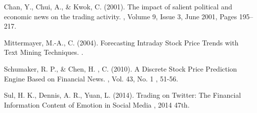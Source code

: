 \documentclass[twoside]{article}
\begin{document}
\begin{multicols}{2}

\begin{thebibliography}{99} %

Chan, Y., Chui, A., \& Kwok, C. (2001).
\newblock The impact of salient political and economic news on the trading activity.
, Volume 9, Issue 3, June 2001, Pages 195–217.

Mittermayer, M.-A., C. (2004).
\newblock Forecasting Intraday Stock Price Trends with Text Mining Techniques.
.

Schumaker, R. P., \& Chen, H. , C. (2010).
\newblock A Discrete Stock Price Prediction Engine Based on Financial News.
, Vol. 43, No. 1 , 51-56.

Sul, H. K., Dennis, A. R., Yuan, L. (2014).
\newblock Trading on Twitter: The Financial Information Content of Emotion in Social Media
, 2014 47th.
 
\end{thebibliography}


\end{multicols}
\end{document}
